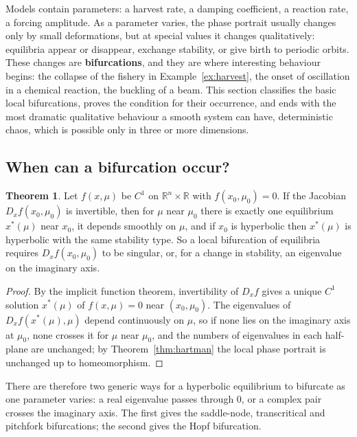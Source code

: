 \documentclass[11pt,a4paper]{article}
\numberwithin{equation}{section}
\theoremstyle{definition}
\newtheorem{thm}{Theorem}[subsection]
\begin{document}
Models contain parameters: a harvest rate, a damping coefficient, a reaction rate, a forcing amplitude. As a parameter varies, the phase portrait usually
changes only by small deformations, but at special values it changes qualitatively: equilibria appear or disappear, exchange stability, or give birth to
periodic orbits. These changes are \textbf{bifurcations}, and they are where interesting behaviour begins: the collapse of the fishery in
Example~\ref{ex:harvest}, the onset of oscillation in a chemical reaction, the buckling of a beam. This section classifies the basic local bifurcations,
proves the condition for their occurrence, and ends with the most dramatic qualitative behaviour a smooth system can have, deterministic chaos, which
is possible only in three or more dimensions.

\subsection{When can a bifurcation occur?}
\label{ssec:bifcond}

\begin{thm}
\label{thm:bifcond}
Let $f(x, \mu)$ be $C^1$ on $\mathbb R^n \times \mathbb R$ with $f(x_0, \mu_0) = 0$. If the Jacobian $D_xf(x_0, \mu_0)$ is invertible, then for $\mu$ near $\mu_0$ there is exactly one equilibrium $x^*(\mu)$ near $x_0$, it depends smoothly
on $\mu$, and if $x_0$ is hyperbolic then $x^*(\mu)$ is hyperbolic with the same stability type. So a local bifurcation of equilibria requires $D_xf(x_0, \mu_0)$ to be singular, or, for a change in stability, an eigenvalue on
the imaginary axis.
\end{thm}

\begin{proof}
By the implicit function theorem, invertibility of $D_xf$ gives a unique $C^1$ solution $x^*(\mu)$ of $f(x, \mu) = 0$ near $(x_0, \mu_0)$. The eigenvalues of $D_xf(x^*(\mu), \mu)$ depend continuously on $\mu$, so if none lies on the
imaginary axis at $\mu_0$, none crosses it for $\mu$ near $\mu_0$, and the numbers of eigenvalues in each half-plane are unchanged; by Theorem~\ref{thm:hartman} the local phase portrait is unchanged up to
homeomorphism.
\end{proof}

There are therefore two generic ways for a hyperbolic equilibrium to bifurcate as one parameter varies: a real eigenvalue passes through $0$, or a complex pair crosses the imaginary axis. The first
gives the saddle-node, transcritical and pitchfork bifurcations; the second gives the Hopf bifurcation.
\end{document}
